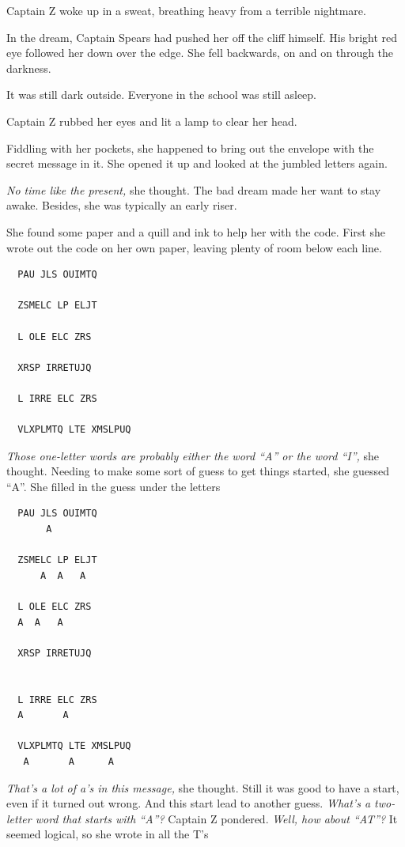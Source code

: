 \documentclass[12pt]{extbook}
\begin{document}
  Captain Z woke up in a sweat, breathing heavy from a terrible nightmare.
  
  In the dream, Captain Spears had pushed her off the cliff himself. His
  bright red eye followed her down over the edge. She fell backwards, on
  and on through the darkness.
  
  It was still dark outside. Everyone in the school was still asleep.
  
  Captain Z rubbed her eyes and lit a lamp to clear her head.
  
  Fiddling with her pockets, she happened to bring out the envelope with
  the secret message in it. She opened it up and looked at the jumbled
  letters again.
  
  \emph{No time like the present,} she thought. The bad dream made her
  want to stay awake. Besides, she was typically an early riser.
  
  She found some paper and a quill and ink to help her with the code.
  First she wrote out the code on her own paper, leaving plenty of room
  below each line.
  
  \begin{lstlisting}
  PAU JLS OUIMTQ
  
  ZSMELC LP ELJT
  
  L OLE ELC ZRS
  
  XRSP IRRETUJQ
  
  L IRRE ELC ZRS
  
  VLXPLMTQ LTE XMSLPUQ
  \end{lstlisting}
  
  \emph{Those one-letter words are probably either the word \enquote{A} or
  the word \enquote{I},} she thought. Needing to make some sort of guess
  to get things started, she guessed \enquote{A}. She filled in the guess
  under the letters
  
  \begin{lstlisting}
  PAU JLS OUIMTQ
       A
  
  ZSMELC LP ELJT
      A  A   A
  
  L OLE ELC ZRS
  A  A   A
  
  XRSP IRRETUJQ
  
  
  L IRRE ELC ZRS
  A       A
  
  VLXPLMTQ LTE XMSLPUQ
   A       A      A
  \end{lstlisting}
  
  \emph{That's a lot of a's in this message,} she thought. Still it was
  good to have a start, even if it turned out wrong. And this start lead
  to another guess. \emph{What's a two-letter word that starts with
  \enquote{A}?} Captain Z pondered. \emph{Well, how about \enquote{AT}?}
  It seemed logical, so she wrote in all the T's
  
\end{document}
